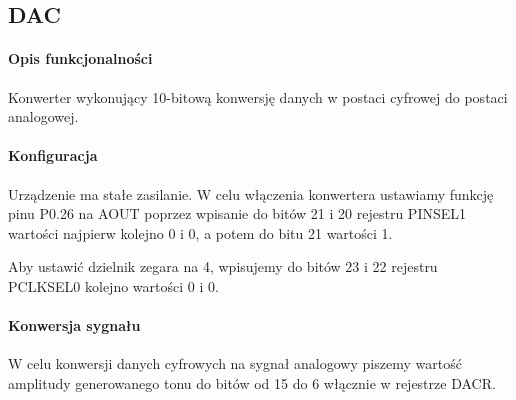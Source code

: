 \subsection{DAC}
    
\paragraph{Opis funkcjonalności}

    Konwerter wykonujący 10-bitową konwersję danych w postaci cyfrowej
    do postaci analogowej.

\paragraph{Konfiguracja}

    Urządzenie ma stałe zasilanie. W celu włączenia konwertera ustawiamy
    funkcję pinu P0.26 na AOUT poprzez wpisanie do bitów 21 i 20
    rejestru PINSEL1 wartości najpierw kolejno 0 i 0, a potem do bitu
    21 wartości 1.

    Aby ustawić dzielnik zegara na 4, wpisujemy do bitów 23 i 22
    rejestru PCLKSEL0 kolejno wartości 0 i 0.

\paragraph{Konwersja sygnału}

    W celu konwersji danych cyfrowych na sygnał analogowy piszemy
    wartość amplitudy generowanego tonu do bitów od 15 do 6 włącznie
    w rejestrze DACR. 

